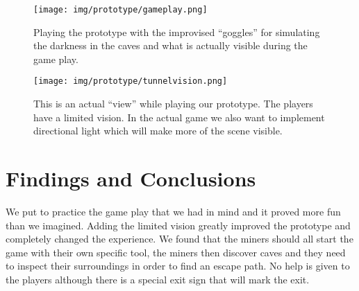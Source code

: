 	\begin{figure}
	\centering
	\texttt{[image: img/prototype/gameplay.png]}
	\caption{Playing the prototype with the improvised \enquote{goggles} for simulating the darkness in the caves and what is actually visible during the game play.}
	\end{figure}
	
	\begin{figure}
	\centering
	\texttt{[image: img/prototype/tunnelvision.png]}
	\caption{This is an actual \enquote{view} while playing our prototype. The players have a limited vision. In the actual game we also want to implement directional light which will make more of the scene visible.}
	\end{figure}
	
	
\begin{figure}
\end{figure}

\section{Findings and Conclusions}
We put to practice the game play that we had in mind and it proved more fun than we imagined. Adding the limited vision greatly improved the prototype and completely changed the experience. We found that the miners should all start the game with their own specific tool, the miners then discover caves and they need to inspect their surroundings in order to find an escape path. No help is given to the players although there is a special exit sign that will mark the exit.


